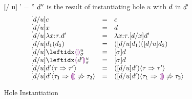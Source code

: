 \begin{figure}[t]
\judgbox
  {[\dexp / u] \dexp' = \dexp''}
  {$d''$ is the result of instantiating hole $u$ with $d$ in $d'$}
\[
\begin{array}{lcll}
[\dexp / u] c
&=&
c\\
{[\dexp / u] x}
&=&
\dexp\\
{[\dexp / u] \halam{x}{\htau}{\dexp'}}
&=&
{\halam{x}{\htau}{[\dexp / x] \dexp'}}\\
{[\dexp / u] \dap{d_1}{d_2}}
&=&
{\dapP{[\dexp / u] d_1}{[\dexp / u] d_2}}
\\
{[\dexp / u]} \dehole{u}{\subst}{}
&=&
[\subst]\dexp
\\
{[\dexp / u] \dhole{\dexp'}{u}{\subst}{}}
&=&
[\subst]\dexp
\\
{[\dexp / u] \dcasttwo{\dexp'}{\htau}{\htau'}}
&=&
\dcasttwo{([\dexp / u] \dexp')}{\htau}{\htau'}
\\
{[\dexp / u] \dcastfail{\dexp'}{\htau_1}{\htau_2}}
&=&
\dcastfail{([\dexp / u] \dexp')}{\htau_1}{\htau_2}
\end{array}
\]
\caption{Hole Instantiation}
\end{figure}
